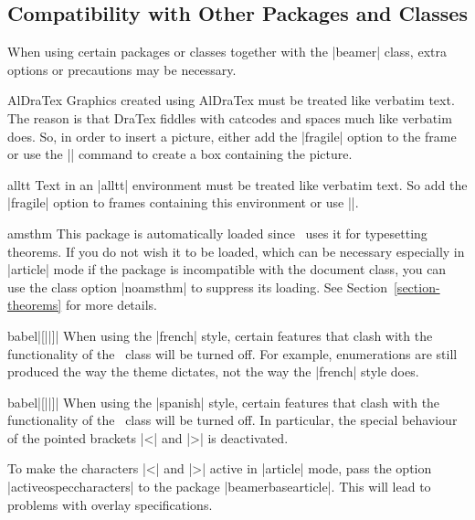 %
%
%


\subsection{Compatibility with Other Packages and Classes}

When using certain packages or classes together with the |beamer| class, extra options or precautions may be necessary.

\begin{package}{{AlDraTex}}
  Graphics created using AlDraTex must be treated like verbatim text. The reason is that DraTex fiddles with catcodes and spaces much like verbatim does. So, in order to insert a picture, either add the |fragile| option to the frame or use the || command to create a box containing the picture.
\end{package}

\begin{package}{{alltt}}
  Text in an |alltt| environment must be treated like verbatim text. So add the |fragile| option to frames containing this environment or use ||.
\end{package}

\begin{package}{{amsthm}}
  This package is automatically loaded since \beamer\ uses it for typesetting theorems. If you do not wish it to be loaded, which can be necessary especially in |article| mode if the package is incompatible with the document class, you can use the class option |noamsthm| to suppress its loading. See Section~\ref{section-theorems} for more details.
\end{package}

\begin{package}{{babel}|[||]|}
  When using the |french| style, certain features that clash with the functionality of the \beamer\ class will be turned off. For example, enumerations are still produced the way the theme dictates, not the way the |french| style does.
\end{package}

\begin{package}{{babel}|[||]|}
  \beamernote
  When using the |spanish| style, certain features that clash with the functionality of the \beamer\ class will be turned off. In particular, the special behaviour of the pointed brackets |<| and |>| is deactivated.

  \articlenote
  To make the characters |<| and |>| active in |article| mode, pass the option |activeospeccharacters| to the package |beamerbasearticle|. This will lead to problems with overlay specifications.
\end{package}

